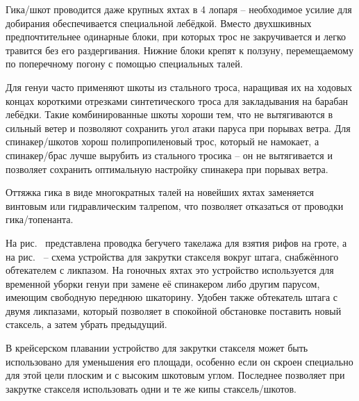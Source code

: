 Гика\-/шкот проводится даже крупных яхтах в 4 лопаря \--- необходимое
усилие для добирания обеспечивается специальной лебёдкой. Вместо
двухшкивных предпочтительнее одинарные блоки, при которых трос не
закручивается и легко травится без его раздергивания. Нижние блоки
крепят к ползуну, перемещаемому по поперечному погону с помощью
специальных талей.

Для генуи часто применяют шкоты из стального троса, наращивая их на
ходовых концах короткими отрезками синтетического троса для
закладывания на барабан лебёдки. Такие комбинированные шкоты хороши
тем, что не вытягиваются в сильный ветер и позволяют сохранить угол
атаки паруса при порывах ветра. Для спинакер\-/шкотов хорош
полипропиленовый трос, который не намокает, а спинакер\-/брас лучше
вырубить из стального тросика \--- он не вытягивается и позволяет
сохранить оптимальную настройку спинакера при порывах ветра.

Оттяжка гика в виде многократных талей на новейших яхтах заменяется
винтовым или гидравлическим талрепом, что позволяет отказаться от
проводки гика\-/топенанта.

На рис.~ представлена проводка бегучего такелажа для взятия
рифов на гроте, а на рис.~ \--- схема устройства для закрутки
стакселя вокруг штага, снабжённого обтекателем с ликпазом. На гоночных
яхтах это устройство используется для временной уборки генуи при
замене её спинакером либо другим парусом, имеющим свободную переднюю
шкаторину. Удобен также обтекатель штага с двумя ликпазами, который
позволяет в спокойной обстановке поставить новый стаксель, а затем
убрать предыдущий.

В крейсерском плавании устройство для закрутки стакселя может быть
использовано для уменьшения его площади, особенно если он скроен
специально для этой цели плоским и с высоким шкотовым углом. Последнее
позволяет при закрутке стакселя использовать одни и те же кипы
стаксель\-/шкотов.

\onecolumn

